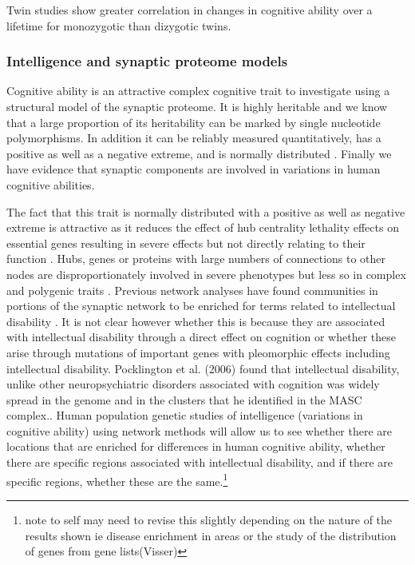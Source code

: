 Twin studies %
\cite{deary2009genetic} show greater correlation in changes in cognitive ability over a lifetime for monozygotic than dizygotic twins.
\subsubsection{Intelligence and synaptic proteome models}
\label{sec:intelligence and synaptic proteome models}
Cognitive ability is an attractive complex cognitive trait to investigate using a structural model of the synaptic proteome. It is highly heritable and we know that a large proportion of its heritability can be marked by single nucleotide polymorphisms. In addition it can be reliably measured quantitatively, has a positive as well as a negative extreme, and is normally distributed \cite{plomin2015genetics}.
Finally we have evidence that synaptic components are involved in variations in human cognitive abilities\cite{hill2014human}. 

The fact that this trait is normally distributed with a positive as well as negative extreme is attractive as it reduces the effect of hub centrality lethality effects on essential genes resulting in severe effects but not directly relating to their function \cite{jeong2001lethality}.
Hubs, genes or proteins with large numbers of connections to other nodes are disproportionately involved in severe phenotypes but less so in complex and polygenic traits \cite{barabasi2011network} \cite{bayes2011characterization}. Previous network analyses have found communities in portions of the synaptic network to be enriched for terms related to intellectual disability  \cite{pocklington2006proteomes}. It is not clear however whether this is because they are associated with intellectual disability through a direct effect on cognition or whether these arise through mutations of important genes with pleomorphic effects including intellectual disability. %
Pocklington et al. (2006) found that intellectual disability, unlike other neuropsychiatric disorders associated with cognition was widely spread in the genome and in the clusters that he identified in the MASC complex.\cite{pocklington2006proteomes}. Human population genetic studies of intelligence (variations in cognitive ability) using network methods will allow us to see whether there are locations that are enriched for differences in human cognitive ability, whether there are specific regions associated with intellectual disability, and if there are specific regions, whether these are the same.\footnote{note to self may need to revise this slightly depending on the nature of the results shown ie disease enrichment in areas or the study of the distribution of genes from gene lists(Visser)} 

